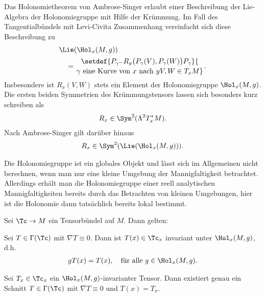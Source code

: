 \documentclass[%
	paper=a5,%
	fleqn,%
	DIV=18,%
	BCOR=0mm,
	fontsize=11pt,
	titlepage=false,%
	bibliography=totoc,
	DIV=18,%
	twoside=true,
	pdftitle=Riemannsche Geometrie,
	pdfauthor=Uwe Semmelmann,
	numbers=noendperiod]%
	{scrbook}
\begin{document}
\begin{rem}[Bemerkungen.]
\begin{remenum}
\item
Das Holonomietheorem von Ambrose-Singer erlaubt einer Beschreibung der Lie-Algebra der Holonomiegruppe mit Hilfe der Krümmung. Im Fall des Tangentialbündels mit Levi-Civita Zusammenhang vereinfacht sich diese Beschreibung zu
\begin{align*}
&\Lie(\Hol_{x}(M,g)) \\
&\quad= \setdef{P_{\gamma^-} R_{y}\bigl(P_{\gamma}(V),P_{\gamma}(W)\bigr) P_{\gamma}}{\atop{\gamma \text{ eine Kurve von }x\text{ nach }y}{ V,W\in T_{x}M}}.
\end{align*}
Insbesondere ist $R_{x}(V,W)$ stets ein Element der Holonomiegruppe $\Hol_{x}(M,g)$. Die ersten beiden Symmetrien des Krümmungstensors lassen sich besonders kurz schreiben als
\begin{align*}
R_{x}\in \Sym^2(\Lambda^2 T_{x}^*M).
\end{align*}
Nach Ambrose-Singer gilt darüber hinaus
\begin{align*}
R_{x}\in \Sym^2(\Lie(\Hol_{x}(M,g))).
\end{align*}
\item Die Holonomiegruppe ist ein globales Objekt und lässt sich im Allgemeinen nicht berechnen, wenn man nur eine kleine Umgebung der Mannigfaltigkeit betrachtet. Allerdings erhält man die Holonomiegruppe einer reell analytischen Mannigfaltigkeiten bereits durch das Betrachten von kleinen Umgebungen, hier ist die Holonomie dann tatsächlich bereits lokal bestimmt.\map
\end{remenum}
\end{rem}


\begin{prop}
Sei $\Tc\to M$ ein Tensorbündel auf $M$. Dann gelten:
\begin{propenum}
\item Sei $T\in \Gamma(\Tc)$ mit $\nabla T \equiv 0$. Dann ist $T(x) \in\Tc_{x}$ invariant unter $\Hol_{x}(M,g)$, d.h.
\begin{align*}
g T(x) = T(x),\quad \text{für alle }g\in \Hol_{x}(M,g).
\end{align*}
\item Sei $T_{x}\in\Tc_{x}$ ein $\Hol_{x}(M,g)$-invarianter Tensor. Dann existiert genau ein Schnitt $T\in \Gamma(\Tc)$ mit $\nabla T \equiv 0$ und $T(x) = T_x$.\fish
\end{propenum}
\end{prop}
\end{document}
